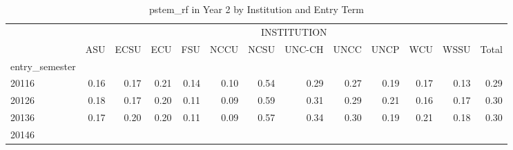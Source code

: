 \begin{table}[!h]
\caption{pstem\_rf in Year 2 by Institution and Entry Term}
\centering
\begin{tabular}{lllllllllllll}
\cline{1-13}
\multicolumn{1}{c}{} &
  \multicolumn{12}{|c}{INSTITUTION} \\
\multicolumn{1}{c}{} &
  \multicolumn{1}{|r}{ASU} &
  \multicolumn{1}{r}{ECSU} &
  \multicolumn{1}{r}{ECU} &
  \multicolumn{1}{r}{FSU} &
  \multicolumn{1}{r}{NCCU} &
  \multicolumn{1}{r}{NCSU} &
  \multicolumn{1}{r}{UNC-CH} &
  \multicolumn{1}{r}{UNCC} &
  \multicolumn{1}{r}{UNCP} &
  \multicolumn{1}{r}{WCU} &
  \multicolumn{1}{r}{WSSU} &
  \multicolumn{1}{r}{Total} \\
\cline{1-13}
\multicolumn{1}{l}{entry\_semester} &
  \multicolumn{1}{|r}{} &
  \multicolumn{1}{r}{} &
  \multicolumn{1}{r}{} &
  \multicolumn{1}{r}{} &
  \multicolumn{1}{r}{} &
  \multicolumn{1}{r}{} &
  \multicolumn{1}{r}{} &
  \multicolumn{1}{r}{} &
  \multicolumn{1}{r}{} &
  \multicolumn{1}{r}{} &
  \multicolumn{1}{r}{} &
  \multicolumn{1}{r}{} \\
\multicolumn{1}{l}{\hspace{1em}20116} &
  \multicolumn{1}{|r}{0.16} &
  \multicolumn{1}{r}{0.17} &
  \multicolumn{1}{r}{0.21} &
  \multicolumn{1}{r}{0.14} &
  \multicolumn{1}{r}{0.10} &
  \multicolumn{1}{r}{0.54} &
  \multicolumn{1}{r}{0.29} &
  \multicolumn{1}{r}{0.27} &
  \multicolumn{1}{r}{0.19} &
  \multicolumn{1}{r}{0.17} &
  \multicolumn{1}{r}{0.13} &
  \multicolumn{1}{r}{0.29} \\
\multicolumn{1}{l}{\hspace{1em}20126} &
  \multicolumn{1}{|r}{0.18} &
  \multicolumn{1}{r}{0.17} &
  \multicolumn{1}{r}{0.20} &
  \multicolumn{1}{r}{0.11} &
  \multicolumn{1}{r}{0.09} &
  \multicolumn{1}{r}{0.59} &
  \multicolumn{1}{r}{0.31} &
  \multicolumn{1}{r}{0.29} &
  \multicolumn{1}{r}{0.21} &
  \multicolumn{1}{r}{0.16} &
  \multicolumn{1}{r}{0.17} &
  \multicolumn{1}{r}{0.30} \\
\multicolumn{1}{l}{\hspace{1em}20136} &
  \multicolumn{1}{|r}{0.17} &
  \multicolumn{1}{r}{0.20} &
  \multicolumn{1}{r}{0.20} &
  \multicolumn{1}{r}{0.11} &
  \multicolumn{1}{r}{0.09} &
  \multicolumn{1}{r}{0.57} &
  \multicolumn{1}{r}{0.34} &
  \multicolumn{1}{r}{0.30} &
  \multicolumn{1}{r}{0.19} &
  \multicolumn{1}{r}{0.21} &
  \multicolumn{1}{r}{0.18} &
  \multicolumn{1}{r}{0.30} \\
\multicolumn{1}{l}{\hspace{1em}20146} &

\end{tabular}
\end{table}
